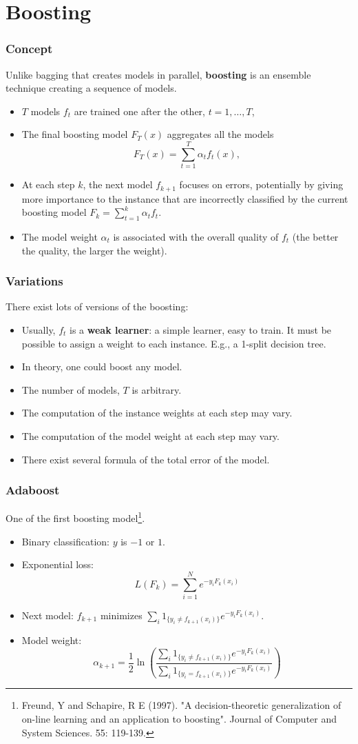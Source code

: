 \section{Boosting}
\begin{frame}
\frametitle{Concept}
Unlike bagging that creates models in parallel, {\bf boosting} is an ensemble technique creating a sequence of models.
\begin{itemize}
\item $T$ models $f_t$ are trained one after the other, $t=1,\ldots,T$,
\item The final boosting model $F_T(x)$ aggregates all the models
$$
F_T(x) = \sum_{t=1}^T \alpha_t f_t(x),
$$
\item At each step $k$, the next model $f_{k+1}$ focuses on errors, potentially by giving more importance to the instance that are incorrectly classified by the current boosting model $F_k=\sum_{t=1}^k \alpha_t f_t$.
\item The model weight $\alpha_t$ is associated with the overall quality of $f_t$ (the better the quality, the larger the weight).
\end{itemize}
\end{frame}
\begin{frame}
\frametitle{Variations}
There exist lots of versions of the boosting:
\begin{itemize}
\item Usually, $f_t$ is a {\bf weak learner}: a simple learner, easy to train. It must be possible to assign a weight to each instance. E.g., a 1-split decision tree.
\item In theory, one could boost any model.
\item The number of models, $T$ is arbitrary.
\item The computation of the instance weights at each step may vary.
\item The computation of the model weight at each step may vary.
\item There exist several formula of the total error of the model.
\end{itemize}
\end{frame}
\begin{frame}
\frametitle{Adaboost}
One of the first boosting model\footnote{Freund, Y and Schapire, R E (1997). "A decision-theoretic generalization of on-line learning and an application to boosting". Journal of Computer and System Sciences. 55: 119-139.}.
\begin{itemize}
\item Binary classification: $y$ is $-1$ or $1$.
\item Exponential loss:
$$
L(F_k) = \sum_{i=1}^N e^{-y_i F_k(x_i)}
$$
\item Next model: $f_{k+1}$ minimizes $\sum_i 1_{\{y_i \neq f_{k+1}(x_i)\}} e^{-y_i F_{k}(x_i)}$.
\item Model weight:
$$
\alpha_{k+1} = \frac{1}{2} \ln \left(\frac{\sum_i 1_{\{y_i \neq f_{k+1}(x_i)\}} e^{-y_i F_{k}(x_i)}}{\sum_i 1_{\{y_i = f_{k+1}(x_i)\}} e^{-y_i F_{k}(x_i)}}\right)
$$
\end{itemize}
\end{frame}
